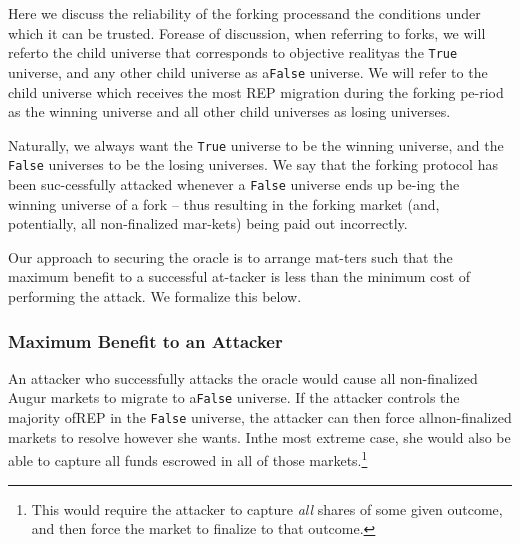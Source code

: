 \documentclass[12pt,floatfix,reprint,nofootinbib,amsmath,amssymb,epsfig,pre,floats,letterpaper,groupedaffiliation]{revtex4-1}
\theoremstyle{definition}
\theoremstyle{definition}
\begin{document}
Here we discuss the reliability of the forking process\linebreak and the conditions under which it can be trusted. For\pagebreak\linebreak  ease of discussion, when referring to forks, we will refer\linebreak to the child universe that corresponds to objective reality\linebreak as the \texttt{True} universe, and any other child universe as a\linebreak \texttt{False} universe. We will refer to the child universe which receives the most REP migration during the forking pe-\linebreak riod as the winning universe and all other child universes as losing universes.

Naturally, we always want the \texttt{True} universe to be the winning universe, and the \texttt{False} universes to be the losing universes. We say that the forking protocol has been suc-\linebreak cessfully attacked whenever a \texttt{False} universe ends up be-\linebreak ing the winning universe of a fork -- thus resulting in the forking market (and, potentially, all non-finalized mar-\linebreak kets) being paid out incorrectly.

Our approach to securing the oracle is to arrange mat-\linebreak ters such that the maximum benefit to a successful at-\linebreak tacker is less than the minimum cost of performing the attack. We formalize this below.

\subsubsection{Maximum Benefit to an Attacker}

An attacker who successfully attacks the oracle would cause all non-finalized Augur markets to migrate to a\linebreak \texttt{False} universe. If the attacker controls the majority of\linebreak REP in the \texttt{False} universe, the attacker can then force all\linebreak non-finalized markets to resolve however she wants. In\linebreak the most extreme case, she would also be able to capture all funds escrowed in all of those markets.\footnote{This would require the attacker to capture \textit{all} shares of some given outcome, and then force the market to finalize to that outcome.}
\end{document}
